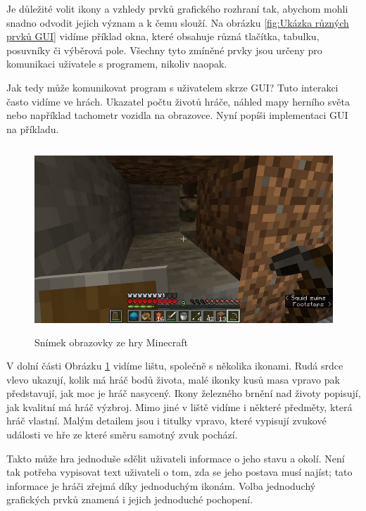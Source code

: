 \documentclass[12pt]{article}
\begin{document}
Je důležité volit ikony a vzhledy prvků grafického rozhraní tak, abychom mohli snadno odvodit jejich význam a k čemu slouží. Na obrázku \ref{fig:Ukázka různých prvků GUI} vidíme příklad okna, které obsahuje různá tlačítka, tabulku, posuvníky či výběrová pole. Všechny tyto zmíněné prvky jsou určeny pro komunikaci uživatele s programem, nikoliv naopak.

Jak tedy může komunikovat program s uživatelem skrze GUI? Tuto interakci často vidíme ve hrách. Ukazatel počtu životů hráče, náhled mapy herního světa nebo například tachometr vozidla na obrazovce. Nyní popíši implementaci GUI na příkladu.

\vspace{0.5cm}
\begin{figure}[h]
    \centering
    \includegraphics[height=7cm]{minecraft.png}
    \caption[Snímek obrazovky ze hry Minecraft]{Snímek obrazovky ze hry Minecraft \cite{minecraft_img}}
    \label{Snímek obrazovky ze hry Minecraft}
\end{figure}

V dolní části Obrázku \ref{Snímek obrazovky ze hry Minecraft} vidíme lištu, společně s několika ikonami. Rudá srdce vlevo ukazují, kolik má hráč bodů života, malé ikonky kusů masa vpravo pak představují, jak moc je hráč nasycený. Ikony železného brnění nad životy popisují, jak kvalitní má hráč výzbroj. Mimo jiné v liště vidíme i některé předměty, která hráč vlastní. Malým detailem jsou i titulky vpravo, které vypisují zvukové události ve hře ze které směru samotný zvuk pochází.

 Takto může hra jednoduše sdělit uživateli informace o jeho stavu a okolí. Není tak potřeba vypisovat text uživateli o tom, zda se jeho postava musí najíst; tato informace je hráči zřejmá díky jednoduchým ikonám. Volba jednoduchý grafických prvků znamená i jejich jednoduché pochopení.
\end{document}
